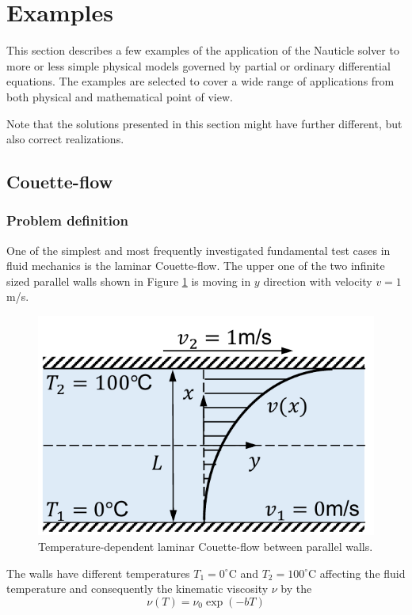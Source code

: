 \documentclass[a4paper,12pt,openany]{book}
\theoremstyle{break}
\begin{document}
\section{Examples} \label{sec:examples}
This section describes a few examples of the application of the Nauticle solver to more or less simple physical models governed by partial or ordinary differential equations. The examples are selected to cover a wide range of applications from both physical and mathematical point of view.

Note that the solutions presented in this section might have further different, but also correct realizations.
\subsection{Couette-flow}
\subsubsection{Problem definition}
One of the simplest and most frequently investigated fundamental test cases in fluid mechanics is the laminar Couette-flow. The upper one of the two infinite sized parallel walls shown in Figure \ref{fig:couette} is moving in $y$ direction with velocity $v=1$m/s.
\begin{figure}[H]
  \includegraphics[scale=0.7]{couette.pdf}
  \centering
  \caption{Temperature-dependent laminar Couette-flow between parallel walls.}
  \label{fig:couette}
\end{figure}\vspace*{3pt}
The walls have different temperatures $T_1=0^\circ$C and $T_2=100^\circ$C affecting the fluid temperature and consequently the kinematic viscosity $\nu$ by the
\begin{equation}
\nu(T)=\nu_0 \exp(-bT)
\end{equation}
\end{document}

